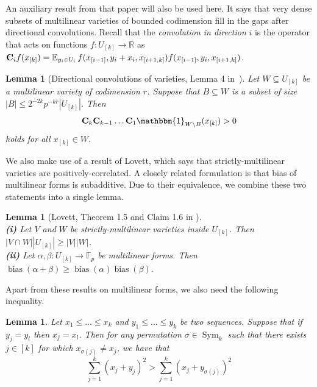 \documentclass[a4paper,11pt]{article}
\newtheorem{lemma}[theorem]{Lemma}
\theoremstyle{definition}
\newcommand\id{\mathbbm{1}}
\newcommand{\on}[1]{
	\operatorname{#1}
}
\newcommand{\bigconv}[1]{
	\mathbf{C}_{#1}
}
\newcommand{\exx}{
  \mathop{
    \mathchoice{\vcenter{\hbox{\larger[4]$\mathbb{E}$}}}
               {\kern0pt\mathbb{E}}
               {\kern0pt\mathbb{E}}
               {\kern0pt\mathbb{E}}
  }\displaylimits
}
\begin{document}
An auxiliary result from that paper will also be used here. It says that very dense subsets of multilinear varieties of bounded codimension fill in the gaps after directional convolutions. Recall that the \textit{convolution in direction} $i$ is the operator that acts on functions $f: U_{[k]} \to \mathbb{R}$ as $\bigconv{i} f(x_{[k]}) = \exx_{y_i \in U_i} f(x_{[i-1]}, y_i + x_i, x_{[i+1, k]}) f(x_{[i-1]}, y_i, x_{[i+1, k]})$.

\begin{lemma}[Directional convolutions of varieties, Lemma 4 in~\cite{LukaOptimalWeak}]\label{convvar} Let $W \subseteq U_{[k]}$ be a multilinear variety of codimension $r$. Suppose that $B \subseteq W$ is a subset of size $|B| \leq 2^{-2k} p^{-kr} |U_{[k]}|$. Then
\[\bigconv{k}\bigconv{k-1} \dots \bigconv{1} \id_{W \setminus B}(x_{[k]}) > 0\]
holds for all $x_{[k]} \in W$.  
\end{lemma}

We also make use of a result of Lovett, which says that strictly-multilinear varieties are positively-correlated. A closely related formulation is that bias of multilinear forms is subadditive. Due to their equivalence, we combine these two statements into a single lemma.

\begin{lemma}[Lovett, Theorem 1.5 and Claim 1.6 in \cite{Lovett}]\label{lovettcorrelation}\phantom{a}\\
    \indent\textbf{(i)} Let $V$ and $W$ be strictly-multilinear varieties inside $U_{[k]}$. Then $|V \cap W| |U_{[k]}| \geq |V||W|$.\\
    \indent \textbf{(ii)} Let $\alpha, \beta : U_{[k]} \to \mathbb{F}_p$ be multilinear forms. Then $\on{bias}(\alpha + \beta) \geq \on{bias}(\alpha)\on{bias}(\beta)$.
\end{lemma}

Apart from these results on multilinear forms, we also need the following inequality.

\begin{lemma}\label{qineq}
 Let $x_1\le \ldots \le x_k$ and $y_1\le \ldots \le y_k$ be two sequences. Suppose that if $y_j=y_l$ then $x_j=x_l$. Then for any permutation $\sigma\in \on{Sym}_k$ such that there exists $j\in [k]$ for which $x_{\sigma(j)}\neq x_j$, we have that $$\sum_{j=1}^k(x_j+y_j)^2 > \sum_{j=1}^k(x_j+y_{\sigma(j)})^2$$   
\end{lemma}
\end{document}
